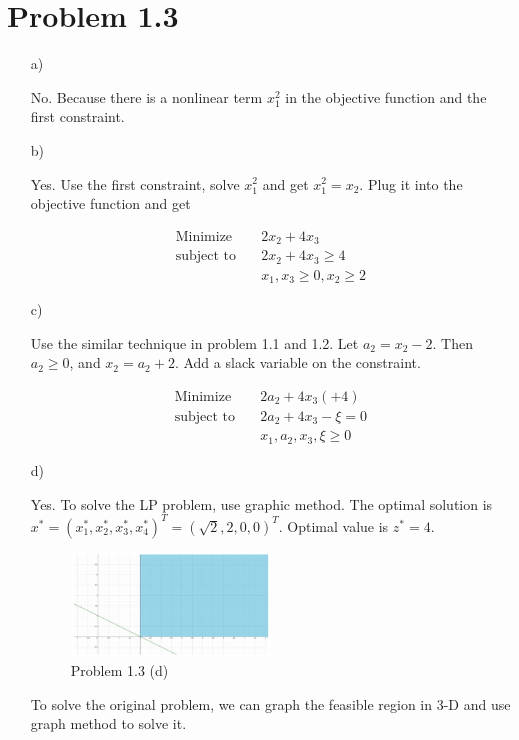 \documentclass[12pt]{article}
\begin{document}
\section*{Problem 1.3}

\begin{enumerate}
\item[a)]

No. Because there is a nonlinear term $x_1^2$ in the objective function and the first constraint.

\item[b)]

Yes. Use the first constraint, solve $x_1^2$ and get $x_1^2 = x_2$. Plug it into the objective function and get 

\begin{equation*}
\begin{aligned}
\text{Minimize} \quad & 2x_2 + 4x_3 \\
\text{subject\  to} \quad & 2x_2 + 4x_3 \geqslant 4 \\
& x_1, x_3 \geqslant 0, x_2 \geqslant 2
\end{aligned}
\end{equation*}


\item[c)]

Use the similar technique in problem 1.1 and 1.2. Let $a_2 = x_2 - 2$. Then $a_2 \geqslant 0$, and $x_2 = a_2 + 2$. Add a slack variable on the constraint. 

\begin{equation*}
\begin{aligned}
\text{Minimize} \quad & 2a_2 + 4x_3 (+ 4) \\
\text{subject\  to} \quad & 2a_2 + 4x_3 - \xi = 0 \\
& x_1, a_2, x_3, \xi \geqslant 0
\end{aligned}
\end{equation*}

\item[d)]

Yes. To solve the LP problem, use graphic method. The optimal solution is $x^* = (x_1^*, x_2^*, x_3^*, x_4^*)^T = (\sqrt{2}, 2, 0, 0)^T$. Optimal value is $z^* = 4$.

\FloatBarrier

\begin{figure}[htpb]
  \caption{Problem 1.3 (d)}
  \centering
    \includegraphics[width=0.5\textwidth]{fig2.pdf}
\end{figure}

\FloatBarrier


To solve the original problem, we can graph the feasible region in 3-D and use graph method to solve it. 


\end{enumerate}
\end{document}
